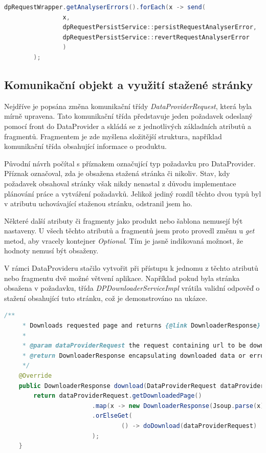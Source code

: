 \documentclass[thesis=B,czech]{FITthesis}[2012/06/26]
\begin{document}
\par

\begin{lstlisting}[language=Java, caption={Příklad zavolání metody odesílající požadavky}]
        dpRequestWrapper.getAnalyserErrors().forEach(x -> send(
                x,
                dpRequestPersistService::persistRequestAnalyserError,
                dpRequestPersistService::revertRequestAnalyserError
                )
        );
\end{lstlisting}

\subsection{Komunikační objekt a využití stažené stránky}
Nejdříve je popsána změna komunikační třídy \textit{DataProviderRequest}, která byla mírně upravena.
Tato komunikační třída představuje jeden požadavek odeslaný pomocí front do DataProvider a skládá se z jednotlivých základních atributů a fragmentů.
Fragmentem je zde myšlena složitější struktura, například komunikační třída obsahující informace o produktu.
\par
Původní návrh počítal s příznakem označující typ požadavku pro DataProvider. Příznak označoval, zda je obsažena stažená stránka či nikoliv. Stav, kdy požadavek obsahoval stránky však nikdy nenastal z důvodu implementace plánování práce a vytváření požadavků. Jelikož jediný rozdíl těchto dvou typů byl v atributu uchovávající staženou stránku, odstranil jsem ho.
\par
Některé další atributy či fragmenty jako produkt nebo šablona nemusejí být nastaveny. U všech těchto atributů a fragmentů jsem proto provedl změnu u \textit{get} metod, aby vracely kontejner \textit{Optional}. Tím je jasně indikovaná možnost, že hodnoty nemusí být obsaženy.
\par
V rámci DataProvideru stačilo vytvořit při přístupu k jednomu z těchto atributů nebo fragmentu dvě možné větvení aplikace.
Například pokud byla stránka obsažena v požadavku, třída \textit{DPDownloaderServiceImpl} vrátila validní odpověď o stažení obsahující tuto stránku, což je demonstrováno 
na ukázce.

\begin{lstlisting}[language=Java, caption={Veřejná metoda třídy \textit{DPDownloaderServiceImpl} zajišťující stažení stránky obsahující detail produktu}]
    /**
     * Downloads requested page and returns {@link DownloaderResponse} object.
     *
     * @param dataProviderRequest the request containing url to be downloaded
     * @return DownloaderResponse encapsulating downloaded data or error
     */
    @Override
    public DownloaderResponse download(DataProviderRequest dataProviderRequest) {
        return dataProviderRequest.getDownloadedPage()
                        .map(x -> new DownloaderResponse(Jsoup.parse(x)))
                        .orElseGet(
                                () -> doDownload(dataProviderRequest)
                        );
    }
\end{lstlisting}
\end{document}
